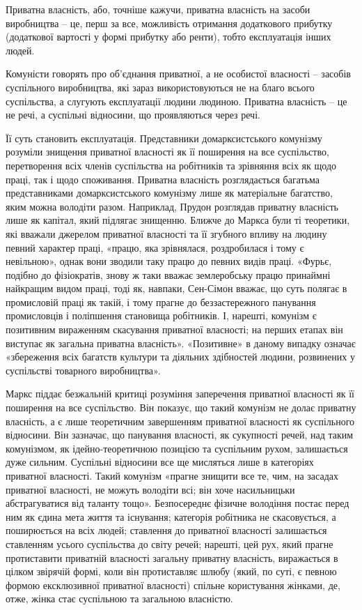 \documentclass[../main]{subfiles}
\begin{document}
Приватна власність, або, точніше кажучи, приватна власність на засоби виробництва – це, перш за все, можливість отримання додаткового прибутку (додаткової вартості у формі прибутку або ренти), тобто експлуатація інших людей.

Комуністи говорять про об’єднання приватної, а не особистої власності – засобів суспільного виробництва, які зараз використовуються не на благо всього суспільства, а слугують експлуатації людини людиною. Приватна власність – це не речі, а суспільні відносини, що проявляються через речі.

Її суть становить експлуатація. Представники домарксистського комунізму розуміли знищення приватної власності як її поширення на все суспільство, перетворення всіх членів суспільства на робітників та зрівняння всіх як щодо праці, так і щодо споживання. Приватна власність розглядається багатьма представниками домарксистського комунізму лише як матеріальне багатство, яким можна володіти разом. Наприклад, Прудон розглядав приватну власність лише як капітал, який підлягає знищенню. Ближче до Маркса були ті теоретики, які вважали джерелом приватної власності та її згубного впливу на людину певний характер праці, «працю, яка зрівнялася, роздробилася і тому є невільною», однак вони зводили таку працю до певних видів праці. «Фурьє, подібно до фізіократів, знову ж таки вважає землеробську працю принаймні найкращим видом праці, тоді як, навпаки, Сен-Сімон вважає, що суть полягає в промисловій праці як такій, і тому прагне до беззастережного панування промисловців і поліпшення становища робітників. І, нарешті, комунізм є позитивним вираженням скасування приватної власності; на перших етапах він виступає як загальна приватна власність». «Позитивне» в даному випадку означає «збереження всіх багатств культури та діяльних здібностей людини, розвинених у суспільстві товарного виробництва».

Маркс піддає безжальній критиці розуміння заперечення приватної власності як її поширення на все суспільство. Він показує, що такий комунізм не долає приватну власність, а є лише теоретичним завершенням приватної власності як суспільного відносини. Він зазначає, що панування власності, як сукупності речей, над таким комунізмом, як ідейно-теоретичною позицією та суспільним рухом, залишається дуже сильним. Суспільні відносини все ще мисляться лише в категоріях приватної власності. Такий комунізм «прагне знищити все те, чим, на засадах приватної власності, не можуть володіти всі; він хоче насильницьки абстрагуватися від таланту тощо». Безпосереднє фізичне володіння постає перед ним як єдина мета життя та існування; категорія робітника не скасовується, а поширюється на всіх людей; ставлення до приватної власності залишається ставленням усього суспільства до світу речей; нарешті, цей рух, який прагне протиставити приватній власності загальну приватну власність, виражається в цілком звірячій формі, коли він протиставляє шлюбу (який, по суті, є певною формою ексклюзивної приватної власності) спільне користування жінками, де, отже, жінка стає суспільною та загальною власністю.
\end{document}
